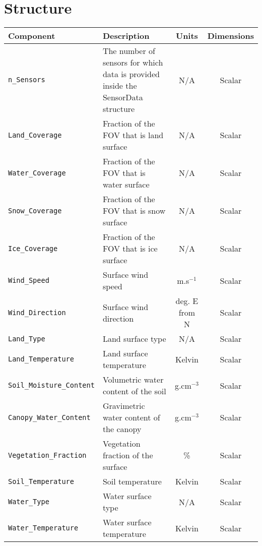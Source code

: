 \clearpage
\section{\Surface{} Structure}
\label{sec:surface_structure}



\begin{table}[htp]
  \centering
  \begin{tabular}{l p{7cm} c c}
    \hline
    \sffamily\textbf{Component} & \sffamily\textbf{Description} & \sffamily\textbf{Units} & \sffamily\textbf{Dimensions} \\
    \hline\hline
    \texttt{n\_Sensors} & The number of sensors for which data is provided inside the SensorData structure & N/A & Scalar \\
    \hline
    \texttt{Land\_Coverage}  & Fraction of the FOV that is land surface & N/A & Scalar \\
    \texttt{Water\_Coverage} & Fraction of the FOV that is water surface & N/A & Scalar \\
    \texttt{Snow\_Coverage}  & Fraction of the FOV that is snow surface & N/A & Scalar \\
    \texttt{Ice\_Coverage}   & Fraction of the FOV that is ice surface & N/A & Scalar \\
    \hline
    \texttt{Wind\_Speed}     & Surface wind speed & m.s$^{-1}$ & Scalar \\
    \texttt{Wind\_Direction} & Surface wind direction & deg. E from N & Scalar \\
    \hline
    \texttt{Land\_Type}              & Land surface type & N/A & Scalar \\
    \texttt{Land\_Temperature}       & Land surface temperature & Kelvin & Scalar \\
    \texttt{Soil\_Moisture\_Content} & Volumetric water content of the soil & g.cm$^{-3}$ & Scalar \\
    \texttt{Canopy\_Water\_Content}  & Gravimetric water content of the canopy & g.cm$^{-3}$ & Scalar \\
    \texttt{Vegetation\_Fraction}    & Vegetation fraction of the surface & \% & Scalar \\
    \texttt{Soil\_Temperature}       & Soil temperature & Kelvin & Scalar \\
    \hline
    \texttt{Water\_Type}        & Water surface type & N/A & Scalar \\
    \texttt{Water\_Temperature} & Water surface temperature & Kelvin & Scalar \\

\end{tabular}
\end{table}
